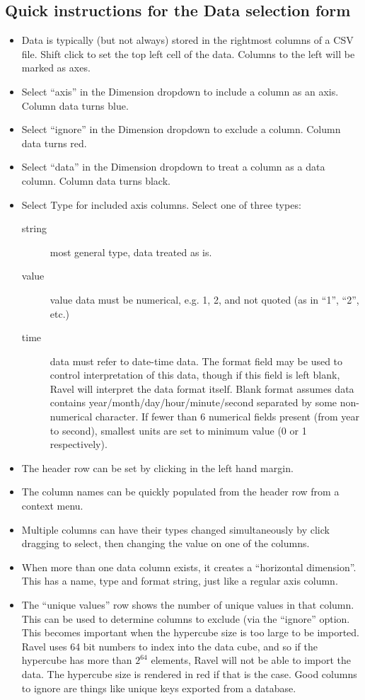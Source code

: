 \subsection{Quick instructions for the Data selection form}

\begin{itemize}
\item Data is typically (but not always) stored in the rightmost columns
  of a CSV file. Shift click to set the top left cell of the data. Columns
  to the left will be marked as axes. 
\item Select ``axis'' in the Dimension dropdown to include a column as
  an axis. Column data turns blue. 
\item Select ``ignore'' in the Dimension dropdown to exclude a column.
  Column data turns red. 
\item Select ``data'' in the Dimension dropdown to treat a column as a
  data column. Column data turns black. 
\item Select Type for included axis columns. Select one of three types: 
  \begin{description}
  \item [{string}] most general type, data treated as is. 
  \item [{value}] value data must be numerical, e.g. 1, 2, and not quoted
    (as in ``1'', ``2'', etc.)
  \item [{time}] data must refer to date-time data. The format field may
    be used to control interpretation of this data, though if this field
    is left blank, Ravel will interpret the data format itself. Blank
    format assumes data contains year/month/day/hour/minute/second separated
    by some non-numerical character. If fewer than 6 numerical fields
    present (from year to second), smallest units are set to minimum value
    (0 or 1 respectively).
  \end{description}
\item The header row can be set by clicking in the left hand margin.
\item The column names can be quickly populated from the header row
  from a context menu.
\item Multiple columns can have their types changed simultaneously by click dragging
  to select, then changing the value on one of the columns.
\item When more than one data column exists, it creates a ``horizontal
  dimension''. This has a name, type and format string, just like a
  regular axis column.
\item The ``unique values'' row shows the number of unique values in
  that column. This can be used to determine columns to exclude (via
  the ``ignore'' option. This becomes important when the hypercube
  size is too large to be imported. Ravel uses 64 bit numbers to index
  into the data cube, and so if the hypercube has more than $2^{64}$
  elements, Ravel will not be able to import the data. The hypercube
  size is rendered in red if that is the case. Good columns to ignore
  are things like unique keys exported from a database.
\end{itemize}

